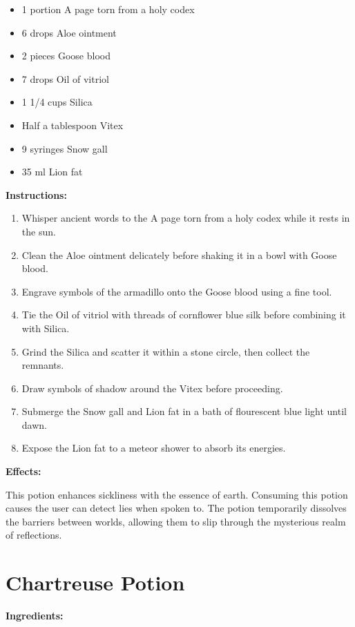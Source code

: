\documentclass{article}
\begin{document}
\begin{itemize}
  \item 1 portion A page torn from a holy codex
  \item 6 drops Aloe ointment
  \item 2 pieces Goose blood
  \item 7 drops Oil of vitriol
  \item 1 1/4 cups Silica
  \item Half a tablespoon Vitex
  \item 9 syringes Snow gall
  \item 35 ml Lion fat
\end{itemize}

\textbf{Instructions:}

\begin{enumerate}
  \item Whisper ancient words to the A page torn from a holy codex while it rests in the sun.
  \item Clean the Aloe ointment delicately before shaking it in a bowl with Goose blood.
  \item Engrave symbols of the armadillo onto the Goose blood using a fine tool.
  \item Tie the Oil of vitriol with threads of cornflower blue silk before combining it with Silica.
  \item Grind the Silica and scatter it within a stone circle, then collect the remnants.
  \item Draw symbols of shadow around the Vitex before proceeding.
  \item Submerge the Snow gall and Lion fat in a bath of flourescent blue light until dawn.
  \item Expose the Lion fat to a meteor shower to absorb its energies.
\end{enumerate}

\textbf{Effects:}

This potion enhances sickliness with the essence of earth. Consuming this potion causes the user can detect lies when spoken to. The potion temporarily dissolves the barriers between worlds, allowing them to slip through the mysterious realm of reflections.

\newpage
\section*{Chartreuse Potion}

\textbf{Ingredients:}
\end{document}
